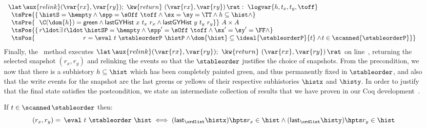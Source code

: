 \[
\begin{array}{l}
\lat\,\aux{relink}(\var{rx}, \var{ry});\
                \kw{return}\ (\var{rx}, \var{ry})\,\rat :\
\logvar{h,t_x,t_y,\toff}\\
\begin{array}[t]{l}
  \tsPre{\{\, \histS = \hempty \wedge \spp = \sOff\ \toff \wedge
    \sx = \sy = \TT \wedge h \subseteq \hist \wedge}\\
  \tsPre{\phantom{\{}\, 
    \C(\dom{h}) = \mathsf{green} \wedge
    \histLGY\ x\ t_x\ r_x \wedge \histLGY\ y\ t_y\ r_y\}}\ A \times A\\
  \tsPos{\{\, r \ldot \exists\, t \ldot\,
    \histSP = \hempty \wedge \spp' = \sOff\ \toff \wedge
    \sx' = \sy' = \FF \wedge}\\
  \tsPos{\phantom{\{\, r \ldot \exists\, t \ldot}
    r = \eval\ t\  {\stableorderP}\ {\histP} \wedge\!
    \dom{\hist} \subseteq \ideal{\stableorderP}{t} \wedge\!
    t \in \scanned{\stableorderP}\}}
\end{array}
\end{array}
\]
Finally, the \jyscan\ method executes $\lat\,\aux{relink}(\var{rx},
\var{ry});\ \kw{return}\ (\var{rx}, \var{ry})\,\rat$ on
line~\lineScanRelinks, returning the selected snapshot $(r_x,r_y)$ and
relinking the events so that the $\stableorder$ justifies the choice
of snapshots. From the precondition, we now that there is a subhistory
$h \subseteq \hist$ which has been completely painted green, and thus
permanently fixed in $\stableorder$, and also that the write events
for the snapshot are the last greens or yellows of their respective
subhistories $\histx$ and $\histy$. In order to justify that the final
state satisfies the postcondition, we state an intermediate collection
of results that we have proven in our Coq development~\cite{CoqFiles}.


\begin{proposition}[$\eval$ inversion]\label{lem:eval-inversion} 
  If $t \in \scanned\, \stableorder$ then:
  \begin{equation*}
    (r_x, r_y) =\, \eval\ t\ \stableorder\ \hist \iff
    (\mathsf{last}_\ordlist \histx) \hpts r_x \in \hist \wedge
    (\mathsf{last}_\ordlist \histy) \hpts r_y \in \hist
  \end{equation*}
\end{proposition}

